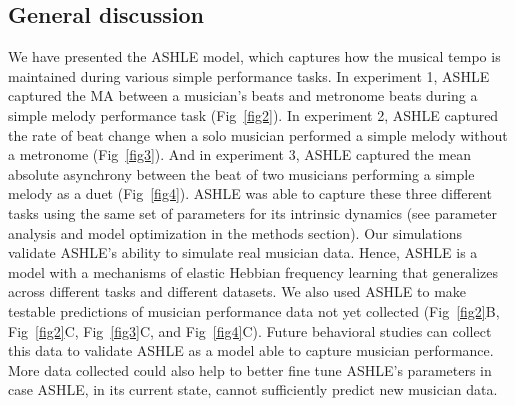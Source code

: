 \documentclass[10pt,letterpaper]{article}
\begin{document}
\subsection*{General discussion}

We have presented the ASHLE model, which captures how the musical tempo is maintained during various simple performance tasks. In experiment 1, ASHLE captured the MA between a musician's beats and metronome beats during a simple melody performance task (Fig~\ref{fig2}). In experiment 2, ASHLE captured the rate of beat change when a solo musician performed a simple melody without a metronome (Fig~\ref{fig3}). And in experiment 3, ASHLE captured the mean absolute asynchrony between the beat of two musicians performing a simple melody as a duet (Fig~\ref{fig4}). ASHLE was able to capture these three different tasks using the same set of parameters for its intrinsic dynamics (see parameter analysis and model optimization in the methods section). Our simulations validate ASHLE's ability to simulate real musician data. Hence, ASHLE is a model with a mechanisms of elastic Hebbian frequency learning that generalizes across different tasks and different datasets. We also used ASHLE to make testable predictions of musician performance data not yet collected (Fig~\ref{fig2}B, Fig~\ref{fig2}C, Fig~\ref{fig3}C, and Fig~\ref{fig4}C). Future behavioral studies can collect this data to validate ASHLE as a model able to capture musician performance. More data collected could also help to better fine tune ASHLE's parameters in case ASHLE, in its current state, cannot sufficiently predict new musician data.
\end{document}
